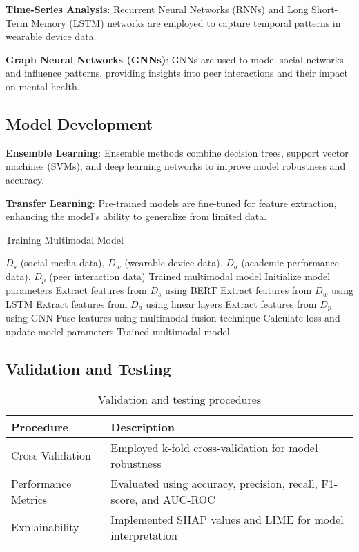 \documentclass{article}
\begin{document}
\textbf{Time-Series Analysis}: Recurrent Neural Networks (RNNs) and Long Short-Term Memory (LSTM) networks are employed to capture temporal patterns in wearable device data.

\textbf{Graph Neural Networks (GNNs)}: GNNs are used to model social networks and influence patterns, providing insights into peer interactions and their impact on mental health.

\subsection{Model Development}
\textbf{Ensemble Learning}: Ensemble methods combine decision trees, support vector machines (SVMs), and deep learning networks to improve model robustness and accuracy.

\textbf{Transfer Learning}: Pre-trained models are fine-tuned for feature extraction, enhancing the model's ability to generalize from limited data.

\begin{algorithm}
\caption{Training Multimodal Model}
\begin{algorithmic}[1]
\Require $D_s$ (social media data), $D_w$ (wearable device data), $D_a$ (academic performance data), $D_p$ (peer interaction data)
\Ensure Trained multimodal model
\State Initialize model parameters
        \State Extract features from $D_s$ using BERT
        \State Extract features from $D_w$ using LSTM
        \State Extract features from $D_a$ using linear layers
        \State Extract features from $D_p$ using GNN
        \State Fuse features using multimodal fusion technique
        \State Calculate loss and update model parameters
    \EndFor
\EndFor
\State \Return Trained multimodal model
\end{algorithmic}
\end{algorithm}

\subsection{Validation and Testing}
\begin{table}[h]
    \centering
    \caption{Validation and testing procedures}
    \vspace{0.3cm}
    \label{tab:validation_testing}
    \begin{tabular}{|l|l|}
    \hline
    \textbf{Procedure} & \textbf{Description} \\
    \hline
    Cross-Validation & Employed k-fold cross-validation for model robustness \\
    Performance Metrics & Evaluated using accuracy, precision, recall, F1-score, and AUC-ROC \\
    Explainability & Implemented SHAP values and LIME for model interpretation \\
    \hline
    \end{tabular}
\end{table}
\end{document}
